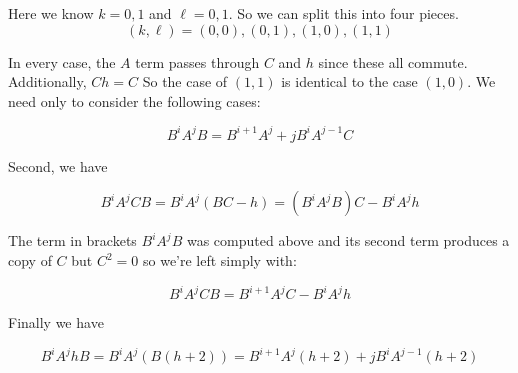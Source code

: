 \documentclass{amsart}
\theoremstyle{definition}
\theoremstyle{remark}
\numberwithin{equation}{section}
\begin{document}
Here we know $k=0,1$ and $\ell = 0,1$.  So we can split this into four pieces. 
\[(k,\ell) = (0,0),(0,1),(1,0),(1,1)\]

In every case, the $A$ term passes through $C$ and $h$ since these all commute.  Additionally, $Ch = C$ So the case of $(1,1)$ is identical to the case $(1,0)$.  We need only to consider the following cases:

\[
B^i A^j B = B^{i+1}A^j + jB^i A^{j-1}C
\]

Second, we have 

\[
B^i A^j C B = B^i A^j (BC-h) = (B^iA^jB)C - B^i A^j h 
\]

The term in brackets $B^iA^jB$ was computed above and its second term produces a copy of $C$ but $C^2=0$ so we're left simply with:

\[
B^i A^j C B = B^{i+1}A^j C - B^i A^j h
\]

Finally we have 

\[
B^i A^j h B = B^i A^j (B(h+2)) = B^{i+1}A^j (h+2) + jB^iA^{j-1}(h+2)
\]
\end{document}
